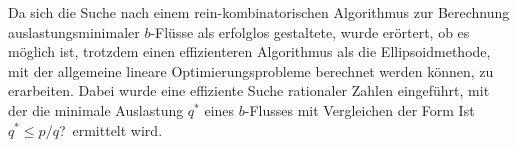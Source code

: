 Da sich die Suche nach einem rein-kombinatorischen Algorithmus zur Berechnung auslastungsminimaler $b$-Flüsse als erfolglos gestaltete, wurde erörtert, ob es möglich ist, trotzdem einen effizienteren Algorithmus als die Ellipsoidmethode, mit der allgemeine lineare Optimierungsprobleme berechnet werden können, zu erarbeiten.
Dabei wurde eine effiziente Suche rationaler Zahlen eingeführt, mit der die minimale Auslastung $q^*$ eines $b$-Flusses mit Vergleichen der Form \glqq Ist $q^*\leq p/q$?\grqq\ ermittelt wird.

